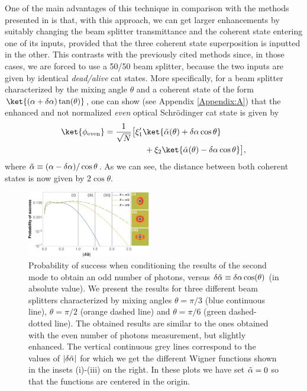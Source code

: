 One of the main advantages of this technique in comparison with the methods presented in \cite{Laghout2013, Sychev2017} is that, with this approach, we can get larger enhancements by suitably changing the beam splitter transmittance and the coherent state entering one of its inputs, provided that the three coherent state superposition is inputted in the other. This contrasts with the previously cited methods since, in those cases, we are forced to use a 50/50 beam splitter, because the two inputs are given by identical \emph{dead/alive} cat states. More specifically, for a beam splitter characterized by the mixing angle $\theta$ and a coherent state of the form $\ket{(\alpha + \delta \alpha) \tan(\theta)}$, one can show (see Appendix \ref{Appendix:A}) that the enhanced and not normalized \emph{even} optical Schrödinger cat state \cite{NoteEvenOdd} is given by
\begin{equation}\label{State:even}
    \begin{aligned}
    \ket{\phi_\text{even}}
    &= \dfrac{1}{\sqrt{N}}
        \big[
             \xi'_1 \ket{\Tilde{\alpha}(\theta) + \delta\alpha \cos \theta}\\
             &\hspace{1.7cm}
             + \xi_2 \ket{\Tilde\alpha(\theta) - \delta \alpha \cos\theta}
        \big],
    \end{aligned}
\end{equation}
where $\Tilde{\alpha} \equiv (\alpha-\delta\alpha)/\cos\theta$. As we can see, the distance between both coherent states is now given by $2\cos\theta$.

\begin{figure}
    \centering
    \includegraphics[width =0.48\textwidth]{Fig8.pdf}
    \caption{Probability of success when conditioning the results of the second mode to obtain an odd number of photons, versus $\delta \Tilde{\alpha} \equiv \delta \alpha \cos(\theta)$ (in absolute value). We present the results for three different beam splitters characterized by mixing angles $\theta = \pi/3$ (blue continuous line), $\theta = \pi/2$ (orange dashed line) and $\theta = \pi/6$ (green dashed-dotted line). The obtained results are similar to the ones obtained with the even number of photons measurement, but slightly enhanced. The vertical continuous grey lines correspond to the values of $|\delta \Tilde{\alpha}|$ for which we get the different Wigner functions shown in the insets (i)-(iii) on the right. In these plots we have set $\Tilde{\alpha} = 0$ so that the functions are centered in the origin.}
    \label{Fig8}
\end{figure}

